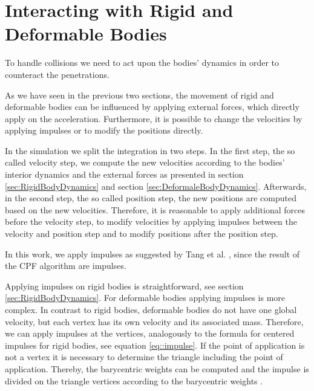 \section{Interacting with Rigid and Deformable Bodies}
\label{sec:InteractingRigDef}
To handle collisions we need to act upon the bodies' dynamics in order to counteract the penetrations.

As we have seen in the previous two sections, the movement of rigid and deformable bodies can be influenced by applying external forces, which directly apply on the acceleration. Furthermore, it is possible to change the velocities by applying impulses or to modify the positions directly.

In the simulation we split the integration in two steps. In the first step, the so called velocity step, we compute the new velocities according to the bodies' interior dynamics and the external forces as presented in section \ref{sec:RigidBodyDynamics} and section \ref{sec:DeformaleBodyDynamics}. Afterwards, in the second step, the so called position step, the new positions are computed based on the new velocities. Therefore, it is reasonable to apply additional forces before the velocity step, to modify velocities by applying impulses between the velocity and position step and to modify positions after the position step. 

In this work, we apply impulses as suggested by Tang et al. \cite{TANG2012}, since the result of the CPF algorithm are impulses.

Applying impulses on rigid bodies is straightforward, see section \ref{sec:RigidBodyDynamics}.
For deformable bodies applying impulses is more complex. In contrast to rigid bodies, deformable bodies do not have one global velocity, but each vertex has its own velocity and its associated mass. Therefore, we can apply impulses at the vertices, analogously to the formula for centered impulses for rigid bodies, see equation \ref{eq::impulse}.
If the point of application is not a vertex it is necessary to determine the triangle including the point of application. Thereby, the barycentric weights can be computed and the impulse is divided on the triangle vertices according to the barycentric weights \cite{TANG2012}.






